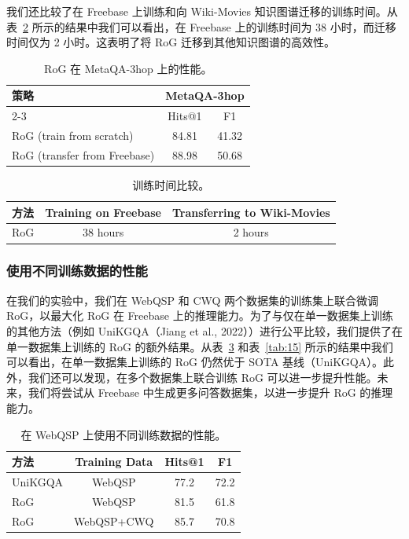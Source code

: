 \documentclass[11pt,UTF8,fontset=fandol]{ctexart}
\begin{document}
我们还比较了在 Freebase 上训练和向 Wiki-Movies 知识图谱迁移的训练时间。从表~\ref{tab:13} 所示的结果中我们可以看出，在 Freebase 上的训练时间为 38 小时，而迁移时间仅为 2 小时。这表明了将 RoG 迁移到其他知识图谱的高效性。

\begin{table}[H]
\centering
\caption{RoG 在 MetaQA-3hop 上的性能。}
\label{tab:12}
\begin{tabular}{lcc}
\toprule
\multirow{2}{*}{策略} & \multicolumn{2}{c}{MetaQA-3hop} \\
\cmidrule(lr){2-3}
 & Hits@1 & F1 \\
\midrule
RoG (train from scratch)     & 84.81 & 41.32 \\
RoG (transfer from Freebase) & 88.98 & 50.68 \\
\bottomrule
\end{tabular}
\end{table}

\begin{table}[H]
\centering
\caption{训练时间比较。}
\label{tab:13}
\begin{tabular}{lcc}
\toprule
方法 & Training on Freebase & Transferring to Wiki-Movies \\
\midrule
RoG & 38 hours & 2 hours \\
\bottomrule
\end{tabular}
\end{table}

\subsubsection{使用不同训练数据的性能}

在我们的实验中，我们在 WebQSP 和 CWQ 两个数据集的训练集上联合微调 RoG，以最大化 RoG 在 Freebase 上的推理能力。为了与仅在单一数据集上训练的其他方法（例如 UniKGQA（Jiang et al., 2022））进行公平比较，我们提供了在单一数据集上训练的 RoG 的额外结果。从表~\ref{tab:14} 和表~\ref{tab:15} 所示的结果中我们可以看出，在单一数据集上训练的 RoG 仍然优于 SOTA 基线（UniKGQA）。此外，我们还可以发现，在多个数据集上联合训练 RoG 可以进一步提升性能。未来，我们将尝试从 Freebase 中生成更多问答数据集，以进一步提升 RoG 的推理能力。

\begin{table}[H]
\centering
\caption{在 WebQSP 上使用不同训练数据的性能。}
\label{tab:14}
\begin{tabular}{lccc}
\toprule
方法 & Training Data & Hits@1 & F1 \\
\midrule
UniKGQA & WebQSP       & 77.2 & 72.2 \\
RoG     & WebQSP       & 81.5 & 61.8 \\
RoG     & WebQSP+CWQ   & 85.7 & 70.8 \\
\bottomrule
\end{tabular}
\end{table}
\end{document}
